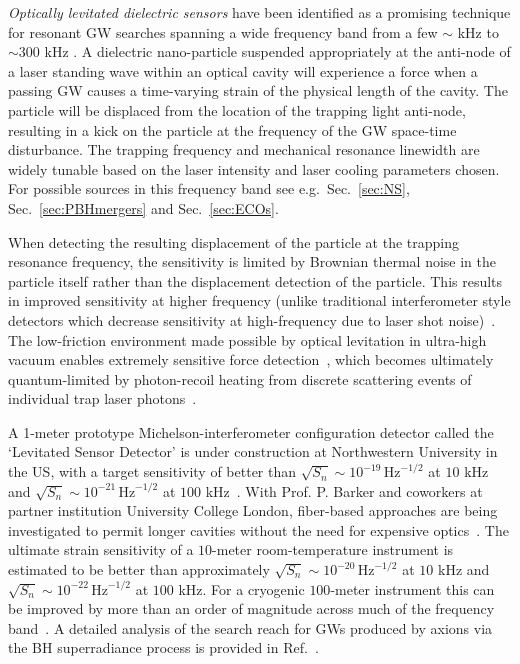 \documentclass[11pt,a4paper]{article}
\begin{document}
\textit{Optically levitated dielectric sensors} have been identified as a promising technique for resonant GW searches spanning a wide frequency band from a few $\sim$ kHz to $\sim 300$ kHz \cite{arvanitaki:2016gw,aggarwal2020searching}. A dielectric nano-particle suspended appropriately at the anti-node of a  laser standing wave within an optical cavity will experience a force when a passing GW causes a time-varying strain of the physical length of the cavity. The particle will be displaced from the location of the trapping light anti-node, resulting in a kick on the particle at the frequency of the GW space-time disturbance. The trapping frequency and mechanical resonance linewidth are widely tunable based on the laser intensity and laser cooling parameters chosen. For possible sources in this frequency band see e.g.~Sec.~\ref{sec:NS}, Sec.~\ref{sec:PBHmergers} and Sec.~\ref{sec:ECOs}.

When detecting the resulting displacement of the particle at the trapping resonance frequency, the sensitivity is limited by Brownian thermal noise in the particle itself rather than the displacement detection of the particle. This results in improved sensitivity at higher frequency (unlike traditional interferometer style detectors which decrease sensitivity at high-frequency due to laser shot noise)~\cite{arvanitaki:2016gw}.  The low-friction environment made possible by optical levitation in ultra-high vacuum enables extremely sensitive force detection~\cite{Ranjit:2016zn}, which becomes ultimately quantum-limited by photon-recoil heating from discrete scattering events of individual trap laser photons~\cite{Jain:2016re}.

A 1-meter prototype Michelson-interferometer configuration detector called the `Levitated Sensor Detector' is under construction at Northwestern University in the US, with a target sensitivity of better than $\sqrt{S_n}  \sim {10}^{-19} \, \text{Hz}^{-1/2}$ at $10$ kHz and $\sqrt{S_n} \sim 10^{-21} \, \text{Hz}^{-1/2}$ at $100$ kHz~\cite{aggarwal2020searching}. With Prof. P. Barker and coworkers at partner institution University College London, fiber-based approaches are being investigated to permit longer cavities without the need for expensive optics~\cite{Pontin:2018fi}. The ultimate strain sensitivity of a $10$-meter room-temperature instrument is estimated to be better than approximately $\sqrt{S_n}  \sim {10}^{-20} \, \text{Hz}^{-1/2}$ at $10$ kHz and $\sqrt{S_n}  \sim 10^{-22} \, \text{Hz}^{-1/2}$ at $100$ kHz. For a cryogenic $100$-meter instrument this can be improved by more than an order of magnitude across much of the frequency band~\cite{aggarwal2020searching}. A detailed analysis of the search reach for GWs produced by axions via the BH superradiance process is provided in Ref.~\cite{aggarwal2020searching}.
\end{document}
